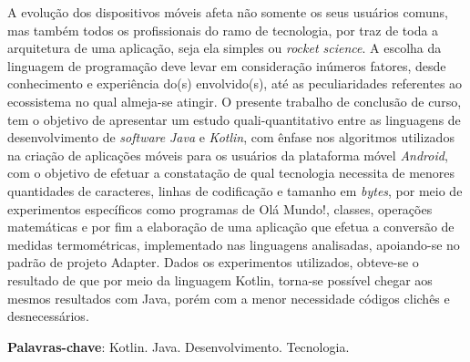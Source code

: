 \begin{resumo}
	A evolução dos dispositivos móveis afeta não somente os seus usuários comuns, mas também todos os profissionais do ramo de tecnologia, por traz de toda a arquitetura de uma aplicação, seja ela simples ou \textit{rocket science}. A escolha da linguagem de programação deve levar em consideração inúmeros fatores, desde conhecimento e experiência do(s) envolvido(s), até as peculiaridades referentes ao ecossistema no qual almeja-se atingir. O presente trabalho de conclusão de curso, tem o objetivo de apresentar um estudo quali-quantitativo entre as linguagens de desenvolvimento de \textit{software} \textit{Java} e \textit{Kotlin}, com ênfase nos algoritmos utilizados na criação de aplicações móveis para os usuários da plataforma móvel \textit{Android}, com o objetivo de efetuar a constatação de qual tecnologia necessita de menores quantidades de caracteres, linhas de codificação e tamanho em \textit{bytes}, por meio de experimentos específicos como programas de Olá Mundo!, classes, operações matemáticas e por fim a elaboração de uma aplicação que efetua a conversão de medidas termométricas, implementado nas linguagens analisadas, apoiando-se no padrão de projeto Adapter. Dados os experimentos utilizados, obteve-se o resultado de que por meio da linguagem Kotlin, torna-se possível chegar aos mesmos resultados com Java, porém com a menor necessidade códigos clichês e desnecessários.
	
	\vspace{\onelineskip}
	
	\textbf{Palavras-chave}: Kotlin. Java. Desenvolvimento. Tecnologia.
	
\end{resumo}